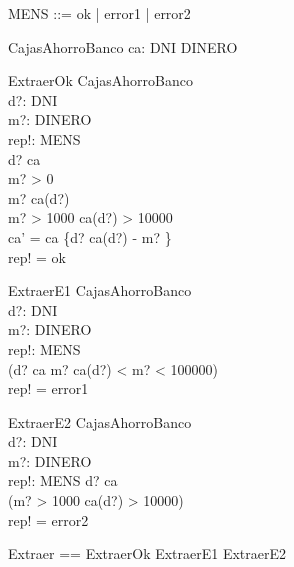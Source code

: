 \documentclass{article}
\begin{document}
\begin{zed}
 [DNI] 
\end{zed}




\begin{zed} 
    MENS ::= ok | error1 | error2
\end{zed}


\begin{schema}{CajasAhorroBanco}
 ca: DNI \pfun DINERO
\end{schema}


\begin{schema}{ExtraerOk}
 \Delta CajasAhorroBanco \\
 d?: DNI \\
 m?: DINERO \\
 rep!: MENS \\
\where
 d? \in \dom ca \\
 m? > 0 \\
 m? \leq ca(d?) \\
 m? > 1000 \implies ca(d?) > 10000 \\
 ca' = ca \oplus \{d? \mapsto ca(d?) - m? \} \\
 rep! = ok

\end{schema}


\begin{schema}{ExtraerE1}
 \Xi CajasAhorroBanco \\
 d?: DNI \\
 m?: DINERO \\
 rep!: MENS \\
\where
\lnot(d? \in \dom ca \land m? \leq ca(d?)  < m? < 100000) \\
rep! = error1
\end{schema}


\begin{schema}{ExtraerE2}
 \Xi CajasAhorroBanco \\
 d?: DNI \\
 m?: DINERO \\
 rep!: MENS 
\where
 d? \in \dom ca \\
 \lnot(m? > 1000 \implies ca(d?) > 10000) \\
 rep! = error2
\end{schema}


\begin{zed}
  Extraer == ExtraerOk \lor ExtraerE1 \lor ExtraerE2
\end{zed}
\end{document}
